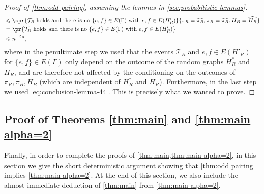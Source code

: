 \documentclass[11pt,reqno,oneside]{amsart}
\theoremstyle{definition}
\newcommand\wh[1]{\widehat{#1}}
\newcommand\1{\mathbf{1}}
\let\leq\leqslant
\begin{document}
\begin{proof}[Proof of \cref{thm:odd pairing}, assuming the lemmas in \cref{sec:probabilistic lemmas}]
\begin{align*}
        &\leq \cpr{\mathcal T_R\text{ holds and there is no }\{e,f\} \in E(\Gamma)\text{ with }e,f \in E(H'_R)}{\pi_R=\wh{\pi_R},\pi_B=\wh{\pi_B},H_B=\wh{H_B}}\\
        &= \pr{\mathcal T_R\text{ holds and there is no }\{e,f\} \in E(\Gamma)\text{ with }e,f \in E(H'_R)}\\
        &\leq n^{-2n},
    \end{align*}
    where in the penultimate step we used that the events $\mathcal{T}_R$ and $e,f \in E(H'_R)$ for $\{e,f\} \in E(\Gamma)$ only depend on the outcome of the random graphs $H^*_R$ and $H_R$, and are therefore not affected by the conditioning on the outcomes of $\pi_R,\pi_B,H_B$ (which are independent of $H^*_R$ and $H_R$). Furthermore, in the last step we used \cref{eq:conclusion-lemma-44}. This is precisely what we wanted to prove.\end{proof}


\subsection{Proof of Theorems \ref{thm:main} and \ref{thm:main alpha=2}}\label{sec:deduce main thm}
Finally, in order to complete the proofs of \cref{thm:main,thm:main alpha=2}, in this section we give the short deterministic argument showing that \cref{thm:odd pairing} implies \cref{thm:main alpha=2}. At the end of this section, we also include the almost-immediate deduction of \cref{thm:main} from \cref{thm:main alpha=2}.
\end{document}
